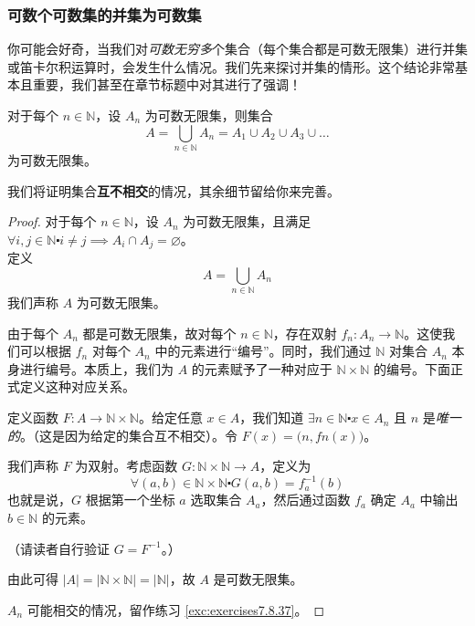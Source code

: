 \subsubsection*{可数个可数集的并集为可数集}

你可能会好奇，当我们对\emph{可数无穷多}个集合（每个集合都是可数无限集）进行并集或笛卡尔积运算时，会发生什么情况。我们先来探讨并集的情形。这个结论非常基本且重要，我们甚至在章节标题中对其进行了强调！

\begin{theorem}\label{theorem7.6.22}
    对于每个 $n \in \mathbb{N}$，设 $A_n$ 为可数无限集，则集合
    \[A = \bigcup_{n \in \mathbb{N}} A_n = A_1 \cup A_2 \cup A_3 \cup \dots\]
    为可数无限集。
\end{theorem}

我们将证明集合\textbf{互不相交}的情况，其余细节留给你来完善。

\begin{proof}
    对于每个 $n \in \mathbb{N}$，设 $A_n$ 为可数无限集，且满足 $\forall i, j \in \mathbb{N} \centerdot i \ne j \implies A_i \cap A_j = \varnothing$。\\
    定义
    \[A = \bigcup_{n \in \mathbb{N}} A_n\]
    我们声称 $A$ 为可数无限集。

    由于每个 $A_n$ 都是可数无限集，故对每个 $n \in \mathbb{N}$，存在双射 $f_n : A_n \to \mathbb{N}$。这使我们可以根据 $f_n$ 对每个 $A_n$ 中的元素进行``编号''。同时，我们通过 $\mathbb{N}$ 对集合 $A_n$ 本身进行编号。本质上，我们为 $A$ 的元素赋予了一种对应于 $\mathbb{N} \times \mathbb{N}$ 的编号。下面正式定义这种对应关系。

    定义函数 $F : A \to \mathbb{N} \times \mathbb{N}$。给定任意 $x \in A$，我们知道 $\exists n \in \mathbb{N} \centerdot x \in A_n$ 且 $n$ 是\emph{唯一的}。（这是因为给定的集合互不相交）。令 $F(x) = \big(n, fn(x)\big)$。

    我们声称 $F$ 为双射。考虑函数 $G : \mathbb{N} \times \mathbb{N} \to A$，定义为
    \[\forall (a, b) \in \mathbb{N} \times \mathbb{N} \centerdot G(a, b) = f_a^{-1}(b)\]
    也就是说，$G$ 根据第一个坐标 $a$ 选取集合 $A_a$，然后通过函数 $f_a$ 确定 $A_a$ 中输出 $b \in \mathbb{N}$ 的元素。

    （请读者自行验证 $G = F^{-1}$。）

    由此可得 $|A| = |\mathbb{N} \times \mathbb{N}| = |\mathbb{N}|$，故 $A$ 是可数无限集。

    $A_n$ 可能相交的情况，留作练习 \ref{exc:exercises7.8.37}。
\end{proof}

